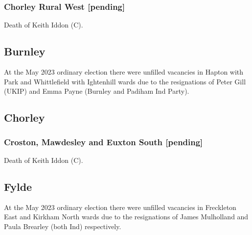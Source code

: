 \documentclass[a4paper,openany]{book}
\begin{document}
\begin{resultsiii}
\subsubsection*{Chorley Rural West \hspace*{\fill}\nolinebreak[1]%
	\enspace\hspace*{\fill}
	[pending]}


Death of Keith Iddon (C).

\subsection*{Burnley}

At the May 2023 ordinary election there were unfilled vacancies in Hapton with Park and Whittlefield with Ightenhill wards due to the resignations of Peter Gill (UKIP) and Emma Payne (Burnley and Padiham Ind Party).%
%

\subsection*{Chorley}

\subsubsection*{Croston, Mawdesley and Euxton South \hspace*{\fill}\nolinebreak[1]%
	\enspace\hspace*{\fill}
	[pending]}


Death of Keith Iddon (C).

\subsection*{Fylde}

At the May 2023 ordinary election there were unfilled vacancies in Freckleton East and Kirkham North wards due to the resignations of James Mulholland and Paula Brearley (both Ind) respectively.%
%


\end{resultsiii}
\end{document}
